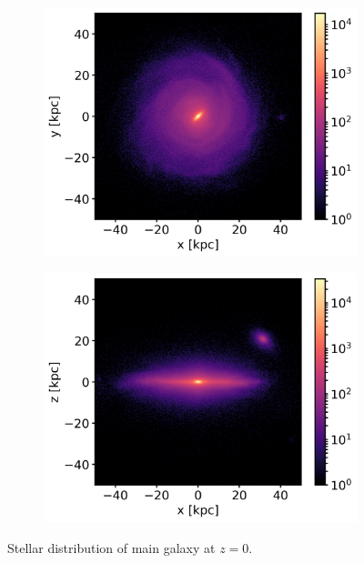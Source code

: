 \begin{figure}
    \centering
    \begin{subfigure}[b]{0.8\textwidth}
	    \includegraphics[width=\textwidth]{plots/Auriga/Au24_stars_xy_distribution_halo0_zoomin.png}
	    \label{fig:Au24_stars_xy_zoomin}
    \end{subfigure}
    
    \begin{subfigure}[b]{0.8\textwidth}
    \centering
    	\includegraphics[width=\textwidth]{plots/Auriga/Au24_stars_xz_distribution_halo0_zoomin.png}
    	\label{fig:Au24_stars_xz_zoomin}
    \end{subfigure}
    \caption{Stellar distribution of main galaxy at $\textit{z}=0$.}\label{fig:Stars_AU24}
\end{figure}

